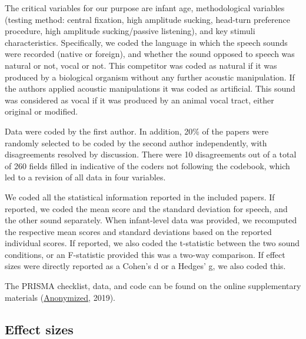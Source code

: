 \documentclass[man,floatsintext]{apa6}
\begin{document}
The critical variables for our purpose are infant age, methodological
variables (testing method: central fixation, high amplitude sucking,
head-turn preference procedure, high amplitude sucking/passive
listening), and key stimuli characteristics. Specifically, we coded the
language in which the speech sounds were recorded (native or foreign),
and whether the sound opposed to speech was natural or not, vocal or
not. This competitor was coded as natural if it was produced by a
biological organism without any further acoustic manipulation. If the
authors applied acoustic manipulations it was coded as artificial. This
sound was considered as vocal if it was produced by an animal vocal
tract, either original or modified.

Data were coded by the first author. In addition, 20\% of the papers
were randomly selected to be coded by the second author independently,
with disagreements resolved by discussion. There were 10 disagreements
out of a total of 260 fields filled in indicative of the coders not
following the codebook, which led to a revision of all data in four
variables.

We coded all the statistical information reported in the included
papers. If reported, we coded the mean score and the standard deviation
for speech, and the other sound separately. When infant-level data was
provided, we recomputed the respective mean scores and standard
deviations based on the reported individual scores. If reported, we also
coded the t-statistic between the two sound conditions, or an
F-statistic provided this was a two-way comparison. If effect sizes were
directly reported as a Cohen's d or a Hedges' g, we also coded this.

The PRISMA checklist, data, and code can be found on the online
supplementary materials
(\href{https://osf.io/4stz9/?view_only=d0696591ebf34bfc8430f848cd945ca8}{Anonymized},
2019).

\subsection{Effect sizes}\label{effect-sizes}
\end{document}
